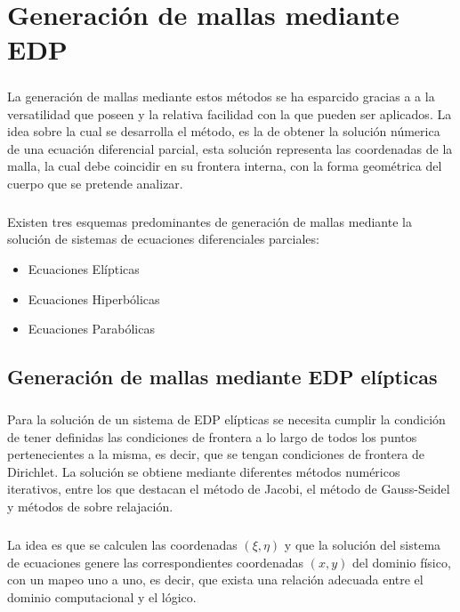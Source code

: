 \documentclass[letterpaper, openright, 12pt]{book}
\begin{document}
%
%
%
%
%

%
%
%
%
%
\chapter{Generación de mallas mediante EDP}
	\paragraph*{}
	La generación de mallas mediante estos métodos se ha esparcido gracias a a la versatilidad que poseen y la relativa facilidad con la que pueden ser aplicados. La idea sobre la cual se desarrolla el método, es la de obtener la solución númerica de una ecuación diferencial parcial, esta solución representa las coordenadas de la malla, la cual debe coincidir en su frontera interna, con la forma geométrica del cuerpo que se pretende analizar.\cite{siladicParabolic}
		
	\paragraph*{}
	Existen tres esquemas predominantes de generación de mallas mediante la solución de sistemas de ecuaciones diferenciales parciales:
	\begin{itemize}
		\item Ecuaciones Elípticas
		\item Ecuaciones Hiperbólicas
		\item Ecuaciones Parabólicas
	\end{itemize}
		
	\section{Generación de mallas mediante EDP elípticas}
		\paragraph*{}
			Para la solución de un sistema de EDP elípticas se necesita cumplir la condición de tener definidas las condiciones de frontera a lo largo de todos los puntos pertenecientes a la misma, es decir, que se tengan condiciones de frontera de Dirichlet.
			La solución se obtiene mediante diferentes métodos numéricos iterativos, entre los que destacan el método de Jacobi, el método de Gauss-Seidel y métodos de sobre relajación.
			
		\paragraph*{}
			La idea es que se calculen las coordenadas $(\xi, \eta)$ y que la solución del sistema de ecuaciones genere las correspondientes coordenadas $(x, y)$ del dominio físico, con un mapeo uno a uno, es decir, que exista una relación adecuada entre el dominio computacional y el lógico.
			
\end{document}
